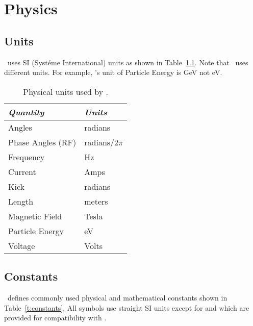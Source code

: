 \chapter{Physics}

\section{Units}
\label{s:units}

\bmad\ uses SI (Syst\'eme International) units as shown in
Table~\ref{t:units}.  Note that \mad\ uses different units. For example,
\mad's unit of Particle Energy is GeV not eV.
\begin{table}[h]
\centering
\begin{tabular}{|l|l|} \hline
  {\em Quantity}     & {\em Units}       \\ \hline
  Angles             &    radians        \\ 
  Phase Angles (RF)  &    radians/2$\pi$ \\ 
  Frequency          &    Hz             \\ 
  Current            &    Amps           \\ 
  Kick               &    radians        \\ 
  Length             &    meters         \\ 
  Magnetic Field     &    Tesla          \\ 
  Particle Energy    &    eV             \\ 
  Voltage            &    Volts          \\ \hline
\end{tabular}
\caption{Physical units used by \bmad.}
\label{t:units}
\end{table}


\section{Constants}
\label{s:constants}

\bmad\ defines commonly used physical and mathematical constants
shown in Table~\ref{t:constants}.  All symbols use straight SI units
except for  and  which are provided for
compatibility with \mad.

